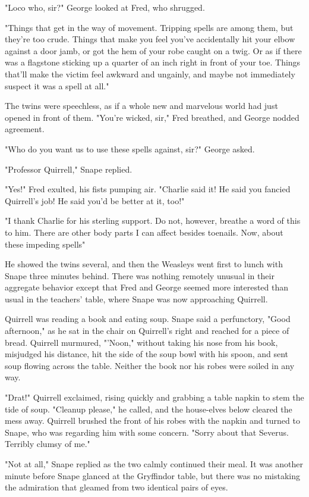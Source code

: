 "Loco who, sir?" George looked at Fred, who shrugged.

"Things that get in the way of movement. Tripping spells are among them, but they're too crude. Things that make you feel you've accidentally hit your elbow against a door jamb, or got the hem of your robe caught on a twig. Or as if there was a flagstone sticking up a quarter of an inch right in front of your toe. Things that'll make the victim feel awkward and ungainly, and maybe not immediately suspect it was a spell at all."

The twins were speechless, as if a whole new and marvelous world had just opened in front of them. "You're wicked, sir," Fred breathed, and George nodded agreement.

"Who do you want us to use these spells against, sir?" George asked.

"Professor Quirrell," Snape replied.

"Yes!" Fred exulted, his fists pumping air. "Charlie said it! He said you fancied Quirrell's job! He said you'd be better at it, too!"

"I thank Charlie for his sterling support. Do not, however, breathe a word of this to him. There are other body parts I can affect besides toenails. Now, about these impeding spells{\el}"

He showed the twins several, and then the Weasleys went first to lunch with Snape three minutes behind. There was nothing remotely unusual in their aggregate behavior except that Fred and George seemed more interested than usual in the teachers' table, where Snape was now approaching Quirrell.

Quirrell was reading a book and eating soup. Snape said a perfunctory, "Good afternoon," as he sat in the chair on Quirrell's right and reached for a piece of bread. Quirrell murmured, "'Noon," without taking his nose from his book, misjudged his distance, hit the side of the soup bowl with his spoon, and sent soup flowing across the table. Neither the book nor his robes were soiled in any way.

"Drat!" Quirrell exclaimed, rising quickly and grabbing a table napkin to stem the tide of soup. "Cleanup please," he called, and the house-elves below cleared the mess away. Quirrell brushed the front of his robes with the napkin and turned to Snape, who was regarding him with some concern. "Sorry about that Severus. Terribly clumsy of me."

"Not at all," Snape replied as the two calmly continued their meal. It was another minute before Snape glanced at the Gryffindor table, but there was no mistaking the admiration that gleamed from two identical pairs of eyes.

